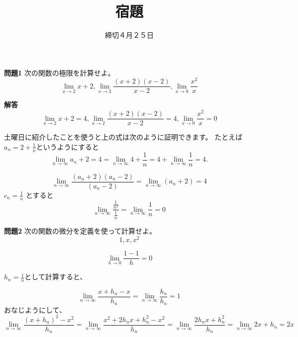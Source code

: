 \documentclass{ltjsarticle}
\title{宿題}
\date{締切４月２５日}
\begin{document}
\maketitle


\par\textbf{問題1}
次の関数の極限を計算せよ。
\begin{equation*}
\lim_{x\to2}x+2,\lim_{x\to 2}{\frac {(x+2)(x-2)}{x-2}},\lim_{x\to 0} {\frac {x^2} {x}}
\end{equation*}

\par\textbf{解答}
\begin{equation*}
\lim_{x\to2}x+2=4,\lim_{x\to 2}{\frac {(x+2)(x-2)}{x-2}}=4,\lim_{x\to 0} {\frac {x^2} {x}}=0
\end{equation*}

土曜日に紹介したことを使うと上の式は次のように証明できます。
たとえば$a_n = 2 + {\frac 1 n}$というようにすると
\begin{equation*}
\lim_{n\to\infty}a_n+2=4 = \lim_{n\to\infty} 4 + {\frac 1 n} = 4+\lim_{n\to\infty}{\frac 1 n} = 4.
\end{equation*}

\begin{equation*}
\lim_{n\to\infty}{\frac {(a_n+2)(a_n-2)} {(a_n-2)}} = \lim_{n\to\infty}(a_n+2) = 4
\end{equation*}
$c_n = {\frac 1 n}$ とすると
\begin{equation*}
\lim_{n\to\infty}{\frac {{\frac 1 {n^2}}} {{\frac 1 n}}} = \lim_{n\to\infty} {\frac 1 n} =0
\end{equation*}

\par\textbf{問題2}
次の関数の微分を定義を使って計算せよ。
\begin{equation*}
1,x,x^2
\end{equation*}

\begin{equation*}
\lim_{h\to0}{\frac {1-1} h} = 0
\end{equation*}

$h_n = {\frac 1 n}$として計算すると、

\begin{equation*}
\lim_{n\to\infty}{\frac {x+h_n-x} {h_n}} = \lim_{n\to\infty}{\frac {h_n} {h_n}}=1
\end{equation*}
おなじようにして、
\begin{equation*}
\lim_{n\to\infty}{\frac {(x+h_n)^2-x^2} {h_n}} = \lim_{n\to\infty}{\frac {x^2+2h_nx+h_n^2-x^2} {h_n}}= \lim_{n\to\infty}{\frac {2h_nx+h_n^2} {h_n}} = \lim_{n\to\infty}2x+h_n = 2x
\end{equation*}
\end{document}
